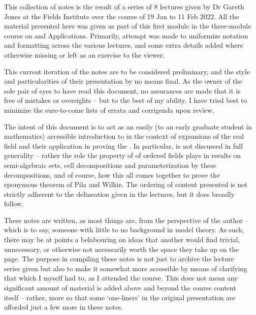 %
%

\preface

This collection of notes is the result of a series of 8 lectures given by Dr Gareth Jones at the Fields Institute over the course of 19 Jan to 11 Feb 2022. All the material presented here was given as part of this first module in the three-module course on \Omy and Applications. Primarily, attempt was made to uniformize notation and formatting across the various lectures, and some extra details added where otherwise missing or left as an exercise to the viewer.

This current iteration of the notes are to be considered preliminary, and the style and particularities of their presentation by no means final. As the owner of the sole pair of eyes to have read this document, no assurances are made that it is free of mistakes or oversights -- but to the best of my ability, I have tried best to minimize the sure-to-come lists of errata and corrigenda upon review.
 
The intent of this document is to act as an easily (to an early graduate student in mathematics) accessible introduction to \omy in the context of expansions of the real field and their application in proving the \pwt. In particular, \omy is not discussed in full generality -- rather the role the property of \omy of ordered fields plays in results on semi-algebraic sets, cell decompositions and parameterization by these decompositions, and of course, how this all comes together to prove the eponymous theorem of Pila and Wilkie. The ordering of content presented is not strictly adherent to the delineation given in the lectures, but it does broadly follow.

These notes are written, as most things are, from the perspective of the author -- which is to say, someone with little to no background in model theory. As such, there may be at points a belabouring on ideas that another would find trivial, unnecessary, or otherwise not necessarily worth the space they take up on the page. The purpose in compiling these notes is not just to archive the lecture series given but also to make it somewhat more accessible by means of clarifying that which I myself had to, as I attended the course. This does not mean any significant amount of material is added above and beyond the course content itself -- rather, more so that some `one-liners' in the original presentation are afforded just a few more in these notes.

